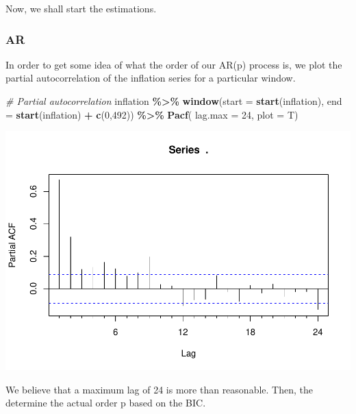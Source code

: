 \documentclass[
]{article}
\newenvironment{Shaded}{\begin{snugshade}}{\end{snugshade}}
\newcommand{\AttributeTok}[1]{\textcolor[rgb]{0.13,0.29,0.53}{#1}}
\newcommand{\CommentTok}[1]{\textcolor[rgb]{0.56,0.35,0.01}{\textit{#1}}}
\newcommand{\DecValTok}[1]{\textcolor[rgb]{0.00,0.00,0.81}{#1}}
\newcommand{\FunctionTok}[1]{\textcolor[rgb]{0.13,0.29,0.53}{\textbf{#1}}}
\newcommand{\NormalTok}[1]{#1}
\newcommand{\SpecialCharTok}[1]{\textcolor[rgb]{0.81,0.36,0.00}{\textbf{#1}}}
\begin{document}
Now, we shall start the estimations.

\hypertarget{ar}{%
\subsubsection{AR}\label{ar}}

In order to get some idea of what the order of our AR(p) process is, we
plot the partial autocorrelation of the inflation series for a
particular window.

\begin{Shaded}
\begin{Highlighting}[]
\CommentTok{\# Partial autocorrelation}
\NormalTok{inflation }\SpecialCharTok{\%\textgreater{}\%}
  \FunctionTok{window}\NormalTok{(}\AttributeTok{start =} \FunctionTok{start}\NormalTok{(inflation), }\AttributeTok{end =} \FunctionTok{start}\NormalTok{(inflation) }\SpecialCharTok{+} \FunctionTok{c}\NormalTok{(}\DecValTok{0}\NormalTok{,}\DecValTok{492}\NormalTok{)) }\SpecialCharTok{\%\textgreater{}\%}
  \FunctionTok{Pacf}\NormalTok{( }\AttributeTok{lag.max =} \DecValTok{24}\NormalTok{, }\AttributeTok{plot =}\NormalTok{ T)}
\end{Highlighting}
\end{Shaded}

\includegraphics{Trabalho_Econo4_Q2_files/figure-latex/unnamed-chunk-6-1.pdf}

We believe that a maximum lag of 24 is more than reasonable. Then, the
determine the actual order p based on the BIC.
\end{document}
